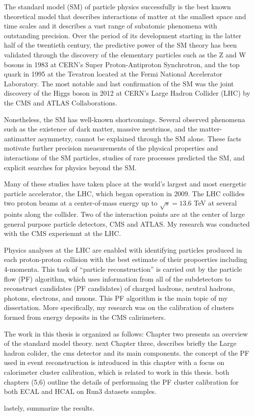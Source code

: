 
The standard model (SM) of particle physics successfully is the best known theoretical model that describes interactions of matter at the smallest space and time scales
and it describes a vast range of subatomic phenomena with outstanding precision.
Over the period of its development starting in the latter half of the twentieth century, the predictive power of the SM theory has been validated through the discovery of the elementary particles such as the Z and W bosons in 1983 at CERN's Super Proton-Antiproton Synchrotron, and the top quark in 1995 at the Tevatron located at the Fermi National Accelerator Laboratory.
The most notable and last confirmation of the SM was the joint discovery of the Higgs boson in 2012 at CERN's Large Hadron Collider (LHC) by the CMS and ATLAS Collaborations.

Nonetheless, the SM has well-known shortcomings.
Several observed phenomena such as the existence of dark matter, massive neutrinos, and the matter-antimatter asymmetry, cannot be explained through the SM alone.
These facts motivate further precision measurements of the physical properties and interactions of the SM particles, studies of rare processes predicted the SM, and explicit searches for physics beyond the SM.

Many of these studies have taken place at the world's largest and most energetic particle accelerator, the LHC, which began operation in 2009.
The LHC collides two proton beams at a center-of-mass energy up to $\sqrt{s}=13.6$ TeV at several points along the collider.
Two of the interaction points are at the center of large general purpose particle detectors, CMS and ATLAS.
My research was conducted with the CMS experiemnt at the LHC.

Physics analyses at the LHC are enabled with identifying particles produced in each proton-proton collision with the best estimate of their propoerties including 4-momenta.
This task of ``particle reconstruction'' is carried out by the particle flow (PF) algorithm, which uses information from all of the subdetectors
to reconstruct candidates (PF candidates) of charged hadrons, neutral hadrons, photons, electrons, and muons.
This PF algorithm is the main topic of my dissertation.
More specifically, my research was on the calibration of clusters formed from energy deposits in the CMS calirimeters.


The work in this thesis is organized as follows:
Chapter two presents an overview of the standard model theory. 
next Chapter three, describes briefly the Large hadron colider, the cms detector and its main components. 
the concept of the PF used in event reconstruction  is introduced in this chapter with a focus on calorimeter cluster calibration, which is related to work in this thesis. 
both chapters (5,6) outline the details of performaing the PF cluster calibration for both ECAL and HCAL on Run3 datasets samples. 

lastely, summarize the results. 
